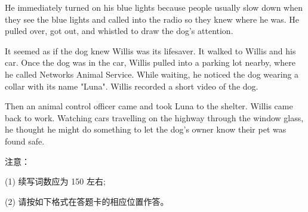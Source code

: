 \documentclass{英语试卷}
\begin{document}
\par He immediately turned on his blue lights because people usually slow down when they see the blue lights and called into the radio so they knew where he was. He pulled over, got out, and whistled to draw the dog's attention.\par
\par It seemed as if the dog knew Willis was its lifesaver. It walked to Willis and his car. Once the dog was in the car, Willis pulled into a parking lot nearby, where he called Networks Animal Service. While waiting, he noticed the dog wearing a collar with its name "Luna". Willis recorded a short video of the dog.\par
\par Then an animal control officer came and took Luna to the shelter. Willis came back to work. Watching cars travelling on the highway through the window glass, he thought he might do something to let the dog's owner know their pet was found safe.\par
\par 注意：\par
\par (1) 续写词数应为 150 左右;\par
\par (2) 请按如下格式在答题卡的相应位置作答。\par
{}
\end{document}
